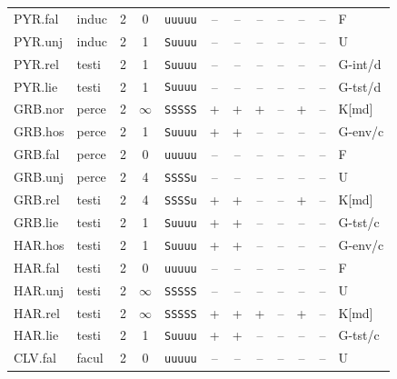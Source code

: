 {\begin{longtable}{@{}llcccccccccl@{}}
PYR.fal & induc & 2 & 0 & \texttt{uuuuu} & \textsf{--} & \textsf{--} & \textsf{--} & \textsf{--} & \textsf{--} & -- & F \\
PYR.unj & induc & 2 & 1 & \texttt{Suuuu} & \textsf{--} & \textsf{--} & \textsf{--} & \textsf{--} & \textsf{--} & -- & U \\
PYR.rel & testi & 2 & 1 & \texttt{Suuuu} & \textsf{--} & \textsf{--} & \textsf{--} & \textsf{--} & \textsf{--} & -- & G-int/d \\
PYR.lie & testi & 2 & 1 & \texttt{Suuuu} & \textsf{--} & \textsf{--} & \textsf{--} & \textsf{--} & \textsf{--} & -- & G-tst/d \\
GRB.nor & perce & 2 & $\infty$ & \texttt{SSSSS} & \textsf{+} & \textsf{+} & \textsf{+} & \textsf{--} & \textsf{+} & -- & K[md] \\
GRB.hos & perce & 2 & 1 & \texttt{Suuuu} & \textsf{+} & \textsf{+} & \textsf{--} & \textsf{--} & \textsf{--} & -- & G-env/c \\
GRB.fal & perce & 2 & 0 & \texttt{uuuuu} & \textsf{--} & \textsf{--} & \textsf{--} & \textsf{--} & \textsf{--} & -- & F \\
GRB.unj & perce & 2 & 4 & \texttt{SSSSu} & \textsf{--} & \textsf{--} & \textsf{--} & \textsf{--} & \textsf{--} & -- & U \\
GRB.rel & testi & 2 & 4 & \texttt{SSSSu} & \textsf{+} & \textsf{+} & \textsf{--} & \textsf{--} & \textsf{+} & -- & K[md] \\
GRB.lie & testi & 2 & 1 & \texttt{Suuuu} & \textsf{+} & \textsf{+} & \textsf{--} & \textsf{--} & \textsf{--} & -- & G-tst/c \\
HAR.hos & testi & 2 & 1 & \texttt{Suuuu} & \textsf{+} & \textsf{+} & \textsf{--} & \textsf{--} & \textsf{--} & -- & G-env/c \\
HAR.fal & testi & 2 & 0 & \texttt{uuuuu} & \textsf{--} & \textsf{--} & \textsf{--} & \textsf{--} & \textsf{--} & -- & F \\
HAR.unj & testi & 2 & $\infty$ & \texttt{SSSSS} & \textsf{--} & \textsf{--} & \textsf{--} & \textsf{--} & \textsf{--} & -- & U \\
HAR.rel & testi & 2 & $\infty$ & \texttt{SSSSS} & \textsf{+} & \textsf{+} & \textsf{+} & \textsf{--} & \textsf{+} & -- & K[md] \\
HAR.lie & testi & 2 & 1 & \texttt{Suuuu} & \textsf{+} & \textsf{+} & \textsf{--} & \textsf{--} & \textsf{--} & -- & G-tst/c \\
CLV.fal & facul & 2 & 0 & \texttt{uuuuu} & \textsf{--} & \textsf{--} & \textsf{--} & \textsf{--} & \textsf{--} & -- & U \\

\end{longtable}}
